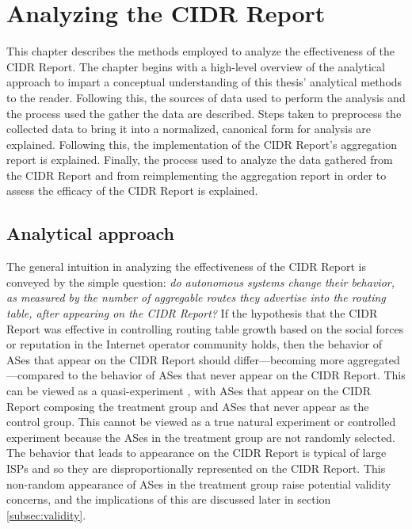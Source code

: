 \chapter{Analyzing the CIDR Report} %
\label{chap:method}

This chapter describes the methods employed to analyze the effectiveness of the
CIDR Report. The chapter begins with a high-level overview of the analytical
approach to impart a conceptual understanding of this thesis' analytical
methods to the reader. Following this, the sources of data used to perform the
analysis and the process used the gather the data are described. Steps taken to
preprocess the collected data to bring it into a normalized, canonical form for
analysis are explained. Following this, the implementation of the CIDR Report's
aggregation report is explained. Finally, the process used to analyze the data
gathered from the CIDR Report and from reimplementing the aggregation report in
order to assess the efficacy of the CIDR Report is explained.

\section{Analytical approach}


The general intuition in analyzing the effectiveness of the CIDR Report is
conveyed by the simple question: \emph{do autonomous systems change their
behavior, as measured by the number of aggregable routes they advertise into
the routing table, after appearing on the CIDR Report?} If the hypothesis that
the CIDR Report was effective in controlling routing table growth based on the
social forces or reputation in the Internet operator community holds, then the
behavior of ASes that appear on the CIDR Report should differ---becoming more
aggregated---compared to the behavior of ASes that never appear on the CIDR
Report. This can be viewed as a quasi-experiment \cite{Babbie:2003uq}, with
ASes that appear on the CIDR Report composing the treatment group and ASes that
never appear as the control group. This cannot be viewed as a true natural
experiment or controlled experiment because the ASes in the treatment group are
not randomly selected. The behavior that leads to appearance on the CIDR Report
is typical of large ISPs and so they are disproportionally represented on the
CIDR Report. This non-random appearance of ASes in the treatment group raise
potential validity concerns, and the implications of this are discussed later
in section \ref{subsec:validity}.

